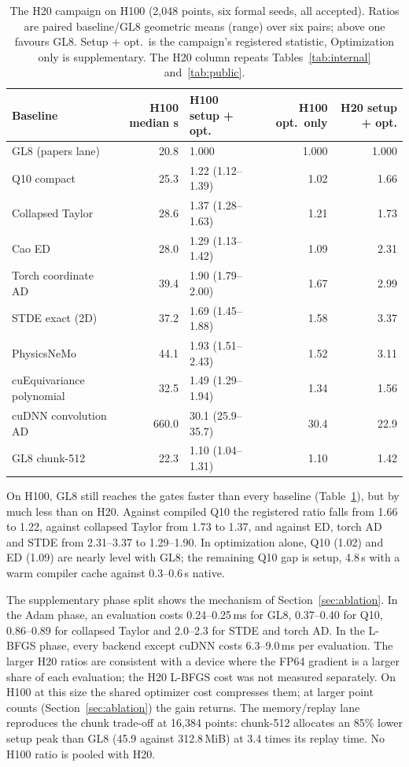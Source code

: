 \documentclass[11pt]{article}
\begin{document}
\begin{table}[t]
\centering
\caption{The H20 campaign on H100 (2,048 points, six formal seeds, all accepted). Ratios are paired baseline/GL8 geometric means (range) over six pairs; above one favours GL8. Setup + opt.\ is the campaign's registered statistic, Optimization only is supplementary. The H20 column repeats Tables~\ref{tab:internal} and~\ref{tab:public}.}
\label{tab:h100retest}
\small
\begin{tabular}{lrlrr}
\toprule
Baseline & H100 median s & H100 setup + opt. & H100 opt.\ only & H20 setup + opt.\\
\midrule
GL8 (papers lane) & 20.8 & 1.000 & 1.000 & 1.000\\
Q10 compact & 25.3 & 1.22 (1.12--1.39) & 1.02 & 1.66\\
Collapsed Taylor & 28.6 & 1.37 (1.28--1.63) & 1.21 & 1.73\\
Cao ED & 28.0 & 1.29 (1.13--1.42) & 1.09 & 2.31\\
Torch coordinate AD & 39.4 & 1.90 (1.79--2.00) & 1.67 & 2.99\\
STDE exact (2D) & 37.2 & 1.69 (1.45--1.88) & 1.58 & 3.37\\
PhysicsNeMo & 44.1 & 1.93 (1.51--2.43) & 1.52 & 3.11\\
cuEquivariance polynomial & 32.5 & 1.49 (1.29--1.94) & 1.34 & 1.56\\
cuDNN convolution AD & 660.0 & 30.1 (25.9--35.7) & 30.4 & 22.9\\
GL8 chunk-512 & 22.3 & 1.10 (1.04--1.31) & 1.10 & 1.42\\
\bottomrule
\end{tabular}
\end{table}

On H100, GL8 still reaches the gates faster than every baseline
(Table~\ref{tab:h100retest}), but by much less than on H20. Against compiled
Q10 the registered ratio falls from 1.66 to 1.22, against collapsed Taylor
from 1.73 to 1.37, and against ED, torch AD and STDE from 2.31--3.37 to
1.29--1.90. In optimization alone, Q10 (1.02) and ED (1.09) are nearly level
with GL8; the remaining Q10 gap is setup, 4.8\,s with a warm compiler cache
against 0.3--0.6\,s native.

The supplementary phase split shows the mechanism of
Section~\ref{sec:ablation}. In the Adam phase, an evaluation costs 0.24--0.25\,ms
for GL8, 0.37--0.40 for Q10, 0.86--0.89 for collapsed Taylor and 2.0--2.3 for
STDE and torch AD. In the L-BFGS phase, every backend except cuDNN costs
6.3--9.0\,ms per evaluation. The larger H20 ratios are consistent with a
device where the FP64 gradient is a larger share of each evaluation; the
H20 L-BFGS cost was not measured separately. On H100 at this
size the shared optimizer cost compresses them; at larger point counts
(Section~\ref{sec:ablation}) the gain returns. The memory/replay lane
reproduces the chunk trade-off at 16,384 points: chunk-512 allocates an 85\%
lower setup peak than GL8 (45.9 against 312.8\,MiB) at 3.4 times its replay
time. No H100 ratio is pooled with H20.
\end{document}
